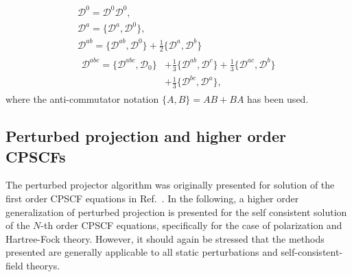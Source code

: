 \documentclass[prl,aps,letterpaper,twocolumn,showpacs,twocolumngrid,superbib]{revtex4}
\def\D{\mathcal{D}}
\begin{document}
\begin{gather}
  \D^{0} =\D^{0} \D^{0},\label{eq:anticommutators1}\\
  \D^{a} =\{\D^{a},\D^{0}\},\label{eq:anticommutators2}\\
  \D^{ab}=\{\D^{ab},\D^{0}\}+\frac{1}{2}\{\D^{a},\D^{b}\}\label{eq:anticommutators3}\\
  \begin{split}
    \D^{abc}=\{\D^{abc},\D_0\}&+\frac{1}{3}\{\D^{ab},\D^{c}\}+\frac{1}{3}\{\D^{ac},\D^{b}\}\\
    &+\frac{1}{3}\{\D^{bc},\D^{a}\}\label{eq:anticommutators4},
  \end{split}
\end{gather}
where the anti-commutator notation $\{A,B\} = AB+BA$ has been used.

\newpage

\subsection{Perturbed projection and higher order CPSCFs}

The perturbed projector algorithm was originally presented for solution of the first 
order CPSCF equations in Ref.~.  In the following, a higher order 
generalization of perturbed projection is presented for the self consistent solution 
of the $N$-th order CPSCF equations, specifically for the case of polarization
and Hartree-Fock theory.  However, it should again be stressed that the methods presented 
are generally applicable to all static perturbations and self-consistent-field theorys.
\end{document}
